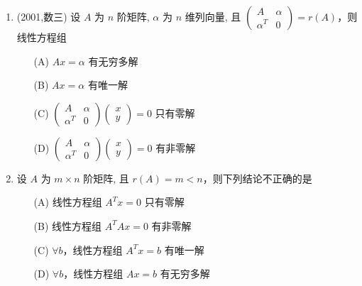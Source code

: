\documentclass[12pt, a4paper, oneside, UTF8]{ctexbook}
\begin{document}
\begin{enumerate}[label=\arabic*.]
    \item (2001,数三) 设 $A$ 为 $n$ 阶矩阵, $\alpha$ 为 $n$ 维列向量, 且 $\begin{pmatrix} A & \alpha \\ \alpha^T & 0 \end{pmatrix} = r(A)$，则线性方程组
    \begin{enumerate}
        \item [(A)] $Ax = \alpha$ 有无穷多解
        \item [(B)] $Ax = \alpha$ 有唯一解
        \item [(C)] $\begin{pmatrix} A & \alpha \\ \alpha^T & 0 \end{pmatrix} \begin{pmatrix} x \\ y \end{pmatrix} = 0$ 只有零解
        \item [(D)] $\begin{pmatrix} A & \alpha \\ \alpha^T & 0 \end{pmatrix} \begin{pmatrix} x \\ y \end{pmatrix} = 0$ 有非零解
    \end{enumerate}
    
    \begin{solution}
    \newpage
    \end{solution}
    
    \item 设 $A$ 为 $m \times n$ 阶矩阵, 且 $r(A) = m < n$，则下列结论不正确的是
    \begin{enumerate}
        \item [(A)] 线性方程组 $A^T x = 0$ 只有零解
        \item [(B)] 线性方程组 $A^T A x = 0$ 有非零解
        \item [(C)] $\forall b$，线性方程组 $A^T x = b$ 有唯一解
        \item [(D)] $\forall b$，线性方程组 $A x = b$ 有无穷多解
    \end{enumerate}
    
    \begin{solution}
    \newpage
    \end{solution}
\end{enumerate}
\end{document}
